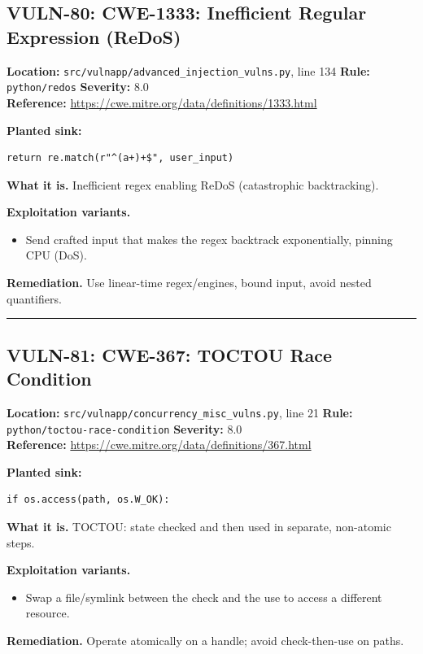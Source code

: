 \documentclass[11pt,a4paper]{article}
\begin{document}
\subsection{VULN-80: CWE-1333: Inefficient Regular Expression (ReDoS)}
\noindent\textbf{Location:} \texttt{src/vulnapp/advanced\_injection\_vulns.py}, line 134 \quad \textbf{Rule:} \texttt{python/redos} \quad \textbf{Severity:} 8.0
\\ \textbf{Reference:} \url{https://cwe.mitre.org/data/definitions/1333.html}

\noindent\textbf{Planted sink:}
\begin{lstlisting}
return re.match(r"^(a+)+$", user_input)
\end{lstlisting}
\noindent\textbf{What it is.} Inefficient regex enabling ReDoS (catastrophic backtracking).

\noindent\textbf{Exploitation variants.}
\begin{itemize}[leftmargin=1.4em,itemsep=1pt,topsep=2pt]
\item Send crafted input that makes the regex backtrack exponentially, pinning CPU (DoS).
\end{itemize}
\noindent\textbf{Remediation.} Use linear-time regex/engines, bound input, avoid nested quantifiers.

\vspace{4pt}\hrule\vspace{6pt}
\subsection{VULN-81: CWE-367: TOCTOU Race Condition}
\noindent\textbf{Location:} \texttt{src/vulnapp/concurrency\_misc\_vulns.py}, line 21 \quad \textbf{Rule:} \texttt{python/toctou-race-condition} \quad \textbf{Severity:} 8.0
\\ \textbf{Reference:} \url{https://cwe.mitre.org/data/definitions/367.html}

\noindent\textbf{Planted sink:}
\begin{lstlisting}
if os.access(path, os.W_OK):
\end{lstlisting}
\noindent\textbf{What it is.} TOCTOU: state checked and then used in separate, non-atomic steps.

\noindent\textbf{Exploitation variants.}
\begin{itemize}[leftmargin=1.4em,itemsep=1pt,topsep=2pt]
\item Swap a file/symlink between the check and the use to access a different resource.
\end{itemize}
\noindent\textbf{Remediation.} Operate atomically on a handle; avoid check-then-use on paths.
\end{document}
